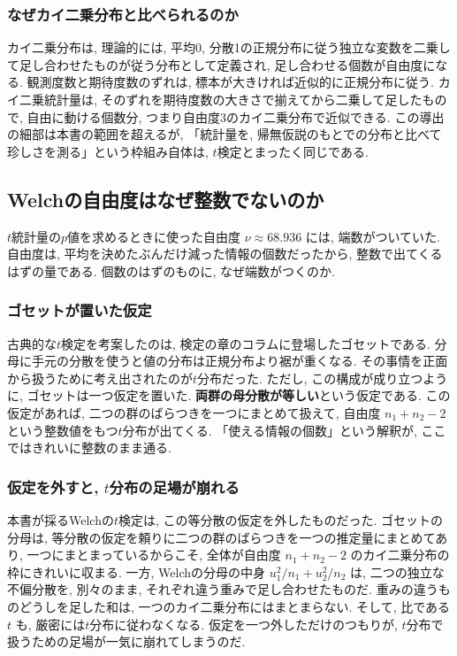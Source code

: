     \subsubsection*{なぜカイ二乗分布と比べられるのか}

    カイ二乗分布は, 理論的には, 平均0, 分散1の正規分布に従う独立な変数を二乗して足し合わせたものが従う分布として定義され, 足し合わせる個数が自由度になる.
    観測度数と期待度数のずれは, 標本が大きければ近似的に正規分布に従う.
    カイ二乗統計量は, そのずれを期待度数の大きさで揃えてから二乗して足したもので, 自由に動ける個数分, つまり自由度3のカイ二乗分布で近似できる.
    この導出の細部は本書の範囲を超えるが, 「統計量を, 帰無仮説のもとでの分布と比べて珍しさを測る」という枠組み自体は, $t$検定とまったく同じである.


  \subsection{Welchの自由度はなぜ整数でないのか}

    $t$統計量の$p$値を求めるときに使った自由度 $\nu \approx 68.936$ には, 端数がついていた.
    自由度は, 平均を決めたぶんだけ減った情報の個数だったから, 整数で出てくるはずの量である.
    個数のはずのものに, なぜ端数がつくのか.

    \subsubsection*{ゴセットが置いた仮定}

    古典的な$t$検定を考案したのは, 検定の章のコラムに登場したゴセットである.
    分母に手元の分散を使うと値の分布は正規分布より裾が重くなる. その事情を正面から扱うために考え出されたのが$t$分布だった.
    ただし, この構成が成り立つように, ゴセットは一つ仮定を置いた.
    \textbf{両群の母分散が等しい}という仮定である.
    この仮定があれば, 二つの群のばらつきを一つにまとめて扱えて, 自由度 $n_1 + n_2 - 2$ という整数値をもつ$t$分布が出てくる.
    「使える情報の個数」という解釈が, ここではきれいに整数のまま通る.

    \subsubsection*{仮定を外すと, \texorpdfstring{$t$}{t}分布の足場が崩れる}

    本書が採るWelchの$t$検定は, この等分散の仮定を外したものだった.
    ゴセットの分母は, 等分散の仮定を頼りに二つの群のばらつきを一つの推定量にまとめてあり, 一つにまとまっているからこそ, 全体が自由度 $n_1 + n_2 - 2$ のカイ二乗分布の枠にきれいに収まる.
    一方, Welchの分母の中身 $u_1^2/n_1 + u_2^2/n_2$ は, 二つの独立な不偏分散を, 別々のまま, それぞれ違う重みで足し合わせたものだ.
    重みの違うものどうしを足した和は, 一つのカイ二乗分布にはまとまらない.
    そして, 比である $t$ も, 厳密には$t$分布に従わなくなる.
    仮定を一つ外しただけのつもりが, $t$分布で扱うための足場が一気に崩れてしまうのだ.

